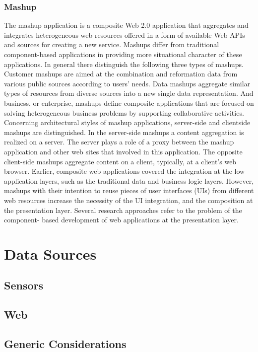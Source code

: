 \subsubsection {Mashup}
The mashup application is a composite Web 2.0 application that aggregates and
integrates heterogeneous web resources offered in a form of available Web APIs and
sources for creating a new service. Mashups differ from traditional component-based
applications in providing more situational character of these applications\cite{yu2008understanding}.
In general there distinguish the following three types of mashups\cite{peenikal2009mashups}. 
Customer mashups are aimed at the combination and reformation data from various
public sources according to users’ needs. Data mashups aggregate similar types of
resources from diverse sources into a new single data representation. And business,
or enterprise, mashups define composite applications that are focused on solving
heterogeneous business problems by supporting collaborative activities\cite{hoyer2008enterprise}.
Concerning architectural styles of mashup applications,
 server-side and clientside mashups are distinguished. In the server-side mashups a content aggregation
is realized on a server. The server plays a role of a proxy between the
mashup application and other web sites that involved in this application. The
opposite client-side mashups aggregate content on a client, typically, at a client’s
web browser\cite{ort2007mashup}.
Earlier, composite web applications covered the integration at the low application
layers, such as the traditional data and business logic layers. However, mashups with
their intention to reuse pieces of user interfaces (UIs) from different web resources
increase the necessity of the UI integration, and the composition at the presentation
layer\cite{daniel2007understanding}. Several research approaches refer to the problem of the component-
based development of web applications at the presentation layer\cite{pietschmann2010application}.
\section {Data Sources}
\subsection {Sensors}
\subsection {Web}
\subsection {Generic Considerations}

